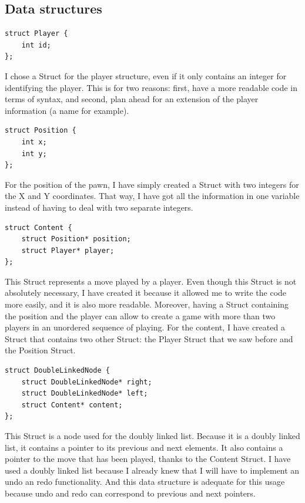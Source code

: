 \documentclass[10pt, a4paper]{article}
\begin{document}
\subsection{Data structures}

\begin{lstlisting}[caption = Player]
struct Player {
	int id;
};
\end{lstlisting}
I chose a Struct for the player structure, even if it only contains an integer for identifying the player. This is for two reasons: first, have a more readable code in terms of syntax, and second, plan ahead for an extension of the player information (a name for example).

\begin{lstlisting}[caption = Position]
struct Position {
	int x;
	int y;
};
\end{lstlisting}
For the position of the pawn, I have simply created a Struct with two integers for the X and Y coordinates.
That way, I have got all the information in one variable instead of having to deal with two separate integers.

\begin{lstlisting}[caption = Content]
struct Content {
	struct Position* position;
	struct Player* player;
};
\end{lstlisting}
This Struct represents a move played by a player.
Even though this Struct is not absolutely necessary, I have created it because it allowed me to write the code more easily, and it is also more readable. Moreover, having a Struct containing the position and the player can allow to create a game with more than two players in an unordered sequence of playing.
For the content, I have created a Struct that contains two other Struct: the Player Struct that we saw before and the Position Struct.

\begin{lstlisting}[caption = Node]
struct DoubleLinkedNode {
	struct DoubleLinkedNode* right;
	struct DoubleLinkedNode* left;
	struct Content* content;
};
\end{lstlisting}
This Struct is a node used for the doubly linked list. Because it is a doubly linked list, it contains a pointer to its previous and next elements. It also contains a pointer to the move that has been played, thanks to the Content Struct.
I have used a doubly linked list because I already knew that I will have to implement an undo an redo functionality. And this data structure is adequate for this usage because undo and redo can correspond to previous and next pointers.
\end{document}
